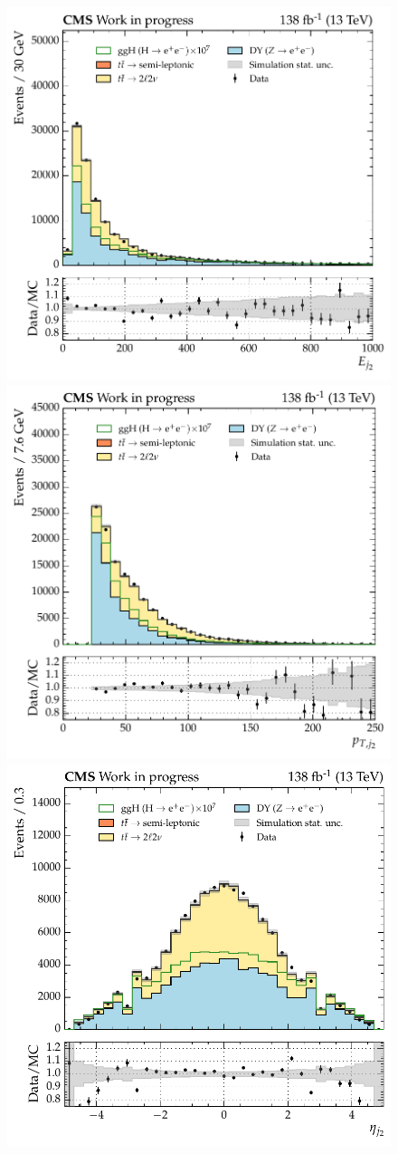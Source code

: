 \begin{figure}[htbp!]
\includegraphics[width =0.33\linewidth]{Figures/Hee/ggH/dataMC/all_inputs/ggH_BDT_pt_reweighted_subleadJetEn.pdf}\hfill%
\includegraphics[width =0.33\linewidth]{Figures/Hee/ggH/dataMC/all_inputs/ggH_BDT_pt_reweighted_subleadJetPt.pdf}\hfill%
\includegraphics[width =0.33\linewidth]{Figures/Hee/ggH/dataMC/all_inputs/ggH_BDT_pt_reweighted_subleadJetEta.pdf}\hfill%
 

\end{figure}
